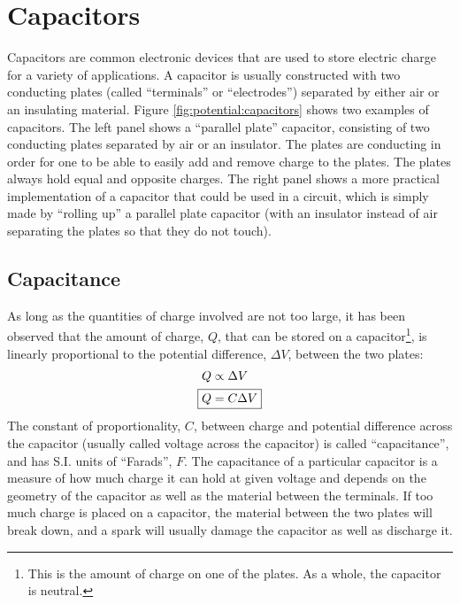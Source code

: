 \section{Capacitors}
Capacitors are common electronic devices that are used to store electric charge for a variety of applications. A capacitor is usually constructed with two conducting plates (called ``terminals'' or ``electrodes'') separated by either air or an insulating material.
Figure \ref{fig:potential:capacitors} shows two examples of capacitors. The left panel shows a ``parallel plate'' capacitor, consisting of two conducting plates separated by air or an insulator. The plates are conducting in order for one to be able to easily add and remove charge to the plates. The plates always hold equal and opposite charges. The right panel shows a more practical implementation of a capacitor that could be used in a circuit, which is simply made by ``rolling up'' a parallel plate capacitor (with an insulator instead of air separating the plates so that they do not touch). 
\subsection{Capacitance}
As long as the quantities of charge involved are not too large, it has been observed that the amount of charge, $Q$, that can be stored on a capacitor\footnote{This is the amount of charge on one of the plates. As a whole, the capacitor is neutral.}, is linearly proportional to the potential difference, $\Delta V$, between the two plates:
\begin{align*}
Q&\propto \Delta V\\
\Aboxed{Q&=C\Delta V}\\
\end{align*}
The constant of proportionality, $C$, between charge and potential difference across the capacitor (usually called voltage across the capacitor) is called ``capacitance'', and has S.I. units of ``Farads'', $F$. The capacitance of a particular capacitor is a measure of how much charge it can hold at given voltage and depends on the geometry of the capacitor as well as the material between the terminals. If too much charge is placed on a capacitor, the material between the two plates will break down, and a spark will usually damage the capacitor as well as discharge it.

